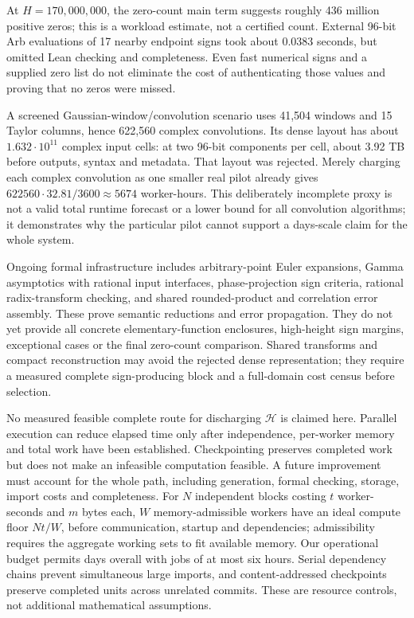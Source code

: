 \documentclass[11pt]{amsart}
\theoremstyle{definition}
\begin{document}
At $H=170{,}000{,}000$, the zero-count main term suggests roughly
436 million positive zeros; this is a workload estimate, not a certified
count. External 96-bit Arb evaluations of 17 nearby endpoint signs took
about 0.0383 seconds, but omitted Lean checking and completeness. Even
fast numerical signs and a supplied zero list do not eliminate the cost of
authenticating those values and proving that no zeros were missed.

A screened Gaussian-window/convolution scenario uses 41,504 windows and
15 Taylor columns, hence 622,560 complex convolutions. Its dense layout
has about $1.632\cdot10^{11}$ complex input cells: at two 96-bit components
per cell, about 3.92 TB before outputs, syntax and metadata. That layout
was rejected. Merely charging each complex convolution as one smaller
real pilot already gives $622560\cdot32.81/3600\approx5674$ worker-hours.
This deliberately incomplete proxy is not a valid total runtime forecast
or a lower bound for all convolution algorithms; it demonstrates why the
particular pilot cannot support a days-scale claim for the whole system.

Ongoing formal infrastructure includes arbitrary-point Euler expansions,
Gamma asymptotics with rational input interfaces, phase-projection sign
criteria, rational radix-transform checking, and shared rounded-product
and correlation error assembly. These prove semantic reductions and error
propagation. They do not yet provide all concrete elementary-function
enclosures, high-height sign margins, exceptional cases or the final
zero-count comparison. Shared transforms and compact reconstruction may
avoid the rejected dense representation; they require a measured complete
sign-producing block and a full-domain cost census before selection.

No measured feasible complete route for discharging $\mathcal H$ is claimed
here. Parallel execution can reduce elapsed time only after independence,
per-worker memory and total work have been established. Checkpointing
preserves completed work but does not make an infeasible computation
feasible. A future improvement must account for the whole path, including
generation, formal checking, storage, import costs and completeness.
For $N$ independent blocks costing $t$ worker-seconds and $m$ bytes each,
$W$ memory-admissible workers have an ideal compute floor $Nt/W$, before
communication, startup and dependencies; admissibility requires the
aggregate working sets to fit available memory. Our operational budget
permits days overall with jobs of at most six hours. Serial dependency
chains prevent simultaneous large imports, and content-addressed
checkpoints preserve completed units across unrelated commits. These are
resource controls, not additional mathematical assumptions.
\end{document}
